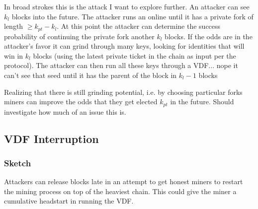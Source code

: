 \documentclass{article}
\begin{document}
In broad strokes this is the attack I want to explore further.  An attacker can see $k_l$ blocks into the future.  The attacker runs an online until it has a private fork of length $\geq k_{pt} - k_l$.  At this point the attacker can determine the success probability of continuing the private fork another $k_l$ blocks.  If the odds are in the attacker's favor it can grind through many keys, looking for identities that will win in $k_l$ blocks (using the latest private ticket in the chain as input per the protocol).  The attacker can then run all these keys through a VDF... nope it can't see that seed until it has the parent of the block in $k_l - 1$ blocks

Realizing that there is still grinding potential, i.e. by choosing particular forks miners can improve the odds that they get elected $k_{pt}$ in the future.  Should investigate how much of an issue this is.

\subsection{VDF Interruption}

\subsubsection{Sketch}
Attackers can release blocks late in an attempt to get honest miners to restart the mining process on top of the heaviest chain.  This could give the miner a cumulative headstart in running the VDF.  
\end{document}

